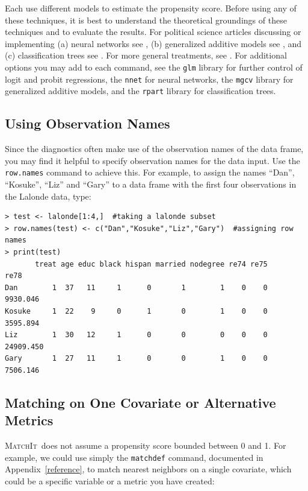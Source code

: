\documentclass[oneside,letterpaper,titlepage]{article}
\newcommand{\MatchIt}{\textsc{MatchIt}}
\begin{document}
Each use different models to estimate the propensity score.  Before
using any of these techniques, it is best to understand the
theoretical groundings of these techniques and to evaluate the
results.  For political science articles discussing or implementing
(a) neural networks see
\citet{BecKinZen00,Zeng99,Zeng00,KinZen02,LagRus02}, (b) generalized
additive models see \citet{BecJac98}, and (c) classification trees see
\citet{RugKimMar03}.  For more general treatments, see
\citet{Bishop95,White92,BreFriOls84}.  For additional options you may
add to each command, see the \texttt{glm} library for further control
of logit and probit regressions, the \texttt{nnet} for neural
networks, the \texttt{mgcv} library for generalized additive models,
and the \texttt{rpart} library for classification trees.

\subsection{Using Observation Names}
\label{rnames}

Since the diagnostics often make use of the observation names of the
data frame, you may find it helpful to specify observation names for the
data input.  Use the \texttt{row.names} command to achieve this.  For
example, to assign the names ``Dan'', ``Kosuke'', ``Liz'' and ``Gary''
to a data frame with the first four observations in the Lalonde data,
type:

\begin{verbatim}
> test <- lalonde[1:4,]  #taking a lalonde subset
> row.names(test) <- c("Dan","Kosuke","Liz","Gary")  #assigning row names
> print(test)
       treat age educ black hispan married nodegree re74 re75      re78
Dan        1  37   11     1      0       1        1    0    0  9930.046
Kosuke     1  22    9     0      1       0        1    0    0  3595.894
Liz        1  30   12     1      0       0        0    0    0 24909.450
Gary       1  27   11     1      0       0        1    0    0  7506.146
\end{verbatim} 

\subsection{Matching on One Covariate or Alternative Metrics}
\MatchIt\ does not assume a propensity score bounded between 0 and 1.
For example, we could use simply the \texttt{matchdef} command,
documented in Appendix~\ref{reference}, to match nearest neighbors on
a single covariate, which could be a specific variable or a metric you
have created:
\end{document}
